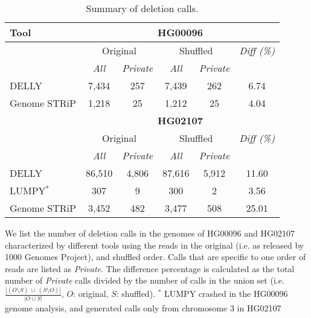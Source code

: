 \documentclass[10pt,a4paper]{article}
\begin{document}
\begin{table}[htb]
\caption{Summary of deletion calls.}
\begin{center}
\begin{tabular}{|l|c|c||c|c||c|}
\hline
{\bf Tool} & \multicolumn{5}{|c|}{\bf HG00096} \\
\hline
{\bf } & \multicolumn{2}{c||}{Original} & \multicolumn{2}{c||}{Shuffled} & {\it Diff (\%) } \\
\cline{2-6}
{\bf } & {\it All } & {\it Private } & {\it All } & {\it Private } & {\it }\\
\hline
DELLY & 7,434 & 257 & 7,439 & 262 & 6.74 \\
Genome STRiP & 1,218 & 25 & 1,212 & 25 & 4.04 \\
\hline
\hline
{\bf } & \multicolumn{5}{|c|}{\bf HG02107} \\
\hline
{\bf } & \multicolumn{2}{c||}{Original} & \multicolumn{2}{c||}{Shuffled} & {\it Diff (\%) } \\
\cline{2-6}
{\bf } & {\it All } & {\it Private } & {\it All } & {\it Private } & {\it }\\
\hline
DELLY & 86,510 & 4,806 & 87,616 & 5,912 & 11.60 \\
LUMPY$^*$ & 307 & 9 & 300 & 2 & 3.56 \\
Genome STRiP & 3,452 & 482 & 3,477 & 508 & 25.01 \\
\hline
\end{tabular}
\end{center}
{\footnotesize  We list the number of deletion calls in the genomes of HG00096 and HG02107 characterized by different tools using the reads in the original (i.e. as released by 1000 Genomes Project), and shuffled order.
  Calls that are specific to one order of reads are listed as {\it Private}. The difference percentage is calculated as the total number of {\it Private} calls divided by the number of calls in the union set  (i.e. $\frac{|(O\setminus S)~\cup~ (S\setminus O)|}{|O\cup S|}$, $O$: original, $S$: shuffled). $^*$ LUMPY crashed in the HG00096 genome analysis, and generated calls only from chromosome 3 in HG02107}
\label{tab:dels-orig-vs-shuf}
\end{table}
\end{document}
